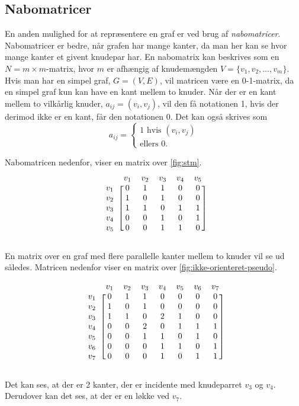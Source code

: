 \subsection{Nabomatricer}
En anden mulighed for at repræsentere en graf er ved brug af \emph{nabomatricer}. Nabomatricer er bedre, når grafen har mange kanter, da man her kan se hvor mange kanter et givent knudepar har.
En nabomatrix kan beskrives som en $N=m \times m$-matrix, hvor $m$ er afhængig af knudemængden $V=\{v_1, v_2, \dotsc, v_m\}$. Hvis man har en simpel graf, $G=(V,E)$, vil matricen være en 0-1-matrix, da en simpel graf kun kan have en kant mellem to knuder. Når der er en kant mellem to  vilkårlig knuder, $a_{ij}=(v_i,v_j)$,  vil den få notationen 1, hvis der derimod ikke er en kant, får den notationen 0.
Det kan også skrives som
\begin{equation}
	a_{ij} =	
	\begin{cases}
		1 \mbox{ hvis } (v_i,v_j) \\
		\mbox{ellers } 0.
	\end{cases}
\end{equation}



Nabomatricen nedenfor, viser en matrix over \autoref{fig:stm}.
\begin{equation}
\begin{blockarray}{cccccc}
		&v_1&v_2&v_3&v_4&v_5 \\
\begin{block}{c[ccccc]}
		v_1&0&1&1&0&0 \\
		v_2&1&0&1&0&0 \\
		v_3&1&1&0&1&1 \\
		v_4&0&0&1&0&1 \\
		v_5&0&0&1&1&0 \\
\end{block}
\end{blockarray}
\end{equation}

En matrix over en graf med flere parallelle kanter mellem to knuder vil se ud således. Matricen nedenfor viser en matrix over \autoref{fig:ikke-orienteret-pseudo}.

\begin{equation}
\begin{blockarray}{cccccccc}
	&v_1&v_2&v_3&v_4&v_5&v_6&v_7 \\
\begin{block}{c[ccccccc]}
	v_1&0&1&1&0&0&0&0 \\
	v_2&1&0&1&0&0&0&0 \\
	v_3&1&1&0&2&1&0&0 \\
	v_4&0&0&2&0&1&1&1 \\
	v_5&0&0&1&1&0&1&0 \\
	v_6&0&0&0&1&1&0&1 \\
	v_7&0&0&0&1&0&1&1 \\
\end{block}
\end{blockarray}	
\end{equation}

Det kan ses, at der er 2 kanter, der er incidente med knudeparret $v_3$ og $v_4$. Derudover kan det ses, at der er en løkke ved $v_7$.

